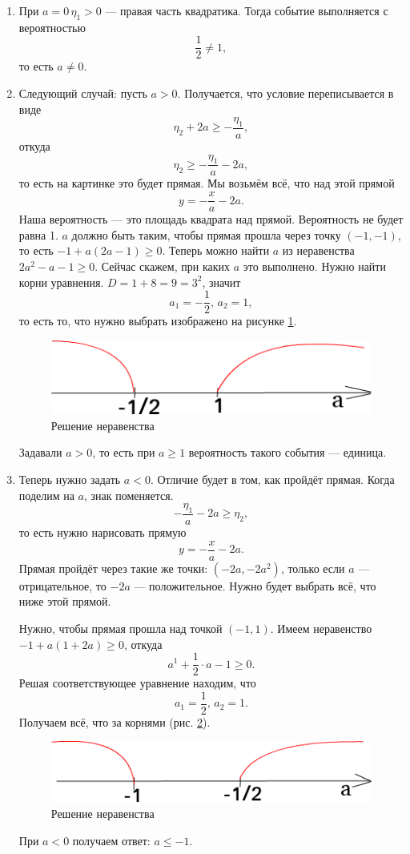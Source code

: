 \begin{enumerate}
 \item При $a = 0 \, \eta_1 > 0$ --- правая часть квадратика.
 Тогда событие выполняется с вероятностью
 $$ \frac{1}{2} \neq 1,$$
 то есть $a \neq 0$.

 \item Следующий случай: пусть $a > 0$.
 Получается, что условие переписывается в виде
 $$ \eta_2 + 2a \geq
  -\frac{ \eta_1}{a},$$
 откуда
 $$ \eta_2 \geq
  -\frac{ \eta_1}{a} - 2a,$$
 то есть на картинке это будет прямая.
 Мы возьмём всё, что над этой прямой
 $$y =
  -\frac{x}{a} - 2a.$$
 Наша вероятность --- это площадь квадрата над прямой.
 Вероятность не будет равна 1.
 $a$ должно быть таким, чтобы прямая прошла через точку $ \left( -1, -1 \right) $,
 то есть $-1 + a \left( 2a - 1 \right) \geq 0$.
 Теперь можно найти $a$ из неравенства $2a^2 - a - 1 \geq 0$.
 Сейчас скажем, при каких $a$ это выполнено.
 Нужно найти корни уравнения.
 $D = 1 + 8 = 9 = 3^2$, значит
 $$a_1 = - \frac{1}{2}, \,
 a_2 = 1,$$
 то есть то, что нужно выбрать изображено на рисунке \ref{fig:291}.

 \begin{figure}[h!]
  \centering
  \includegraphics[width=.5\textwidth]{./pictures/2_9_1.png}
  \caption{Решение неравенства}
  \label{fig:291}
 \end{figure}

 Задавали $a > 0$, то есть при $a \geq 1$ вероятность такого события --- единица.

\item Теперь нужно задать $a < 0$.
 Отличие будет в том, как пройдёт прямая.
 Когда поделим на $a$, знак поменяется.
 $$-\frac{ \eta_1}{a} - 2a \geq
   \eta_2,$$
 то есть нужно нарисовать прямую
 $$y =
  -\frac{x}{a} - 2a.$$
 Прямая пройдёт через такие же точки: $ \left( -2a, -2a^2 \right) $, только если $a$ ---
 отрицательное, то $-2a$ --- положительное.
 Нужно будет выбрать всё, что ниже этой прямой.

 Нужно, чтобы прямая прошла над точкой $ \left( -1, 1 \right) $.
 Имеем неравенство $-1 + a \left( 1 + 2a \right) \geq 0$, откуда
 $$a^1 + \frac{1}{2} \cdot a - 1 \geq
    0.$$
 Решая соответствующее уравнение находим, что
 $$a_1 = \frac{1}{2}, \,
  a_2 = 1.$$
 Получаем всё, что за корнями (рис. \ref{fig:292}).

 \begin{figure}[h!]
  \centering
  \includegraphics[width=.5\textwidth]{./pictures/2_9_2.png}
  \caption{Решение неравенства}
  \label{fig:292}
 \end{figure}

 При $a < 0$ получаем ответ: $a \leq -1$.
\end{enumerate}

